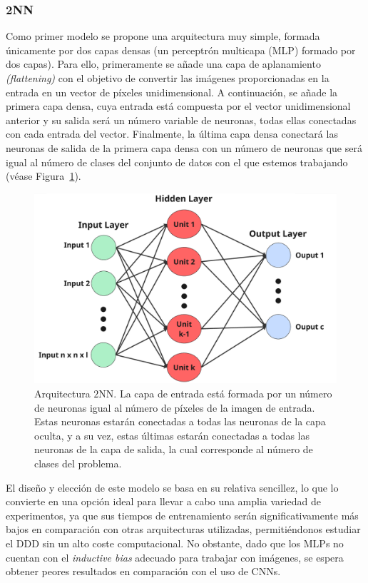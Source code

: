 \subsubsection{2NN}\label{subsubsec:2NN}

Como primer modelo se propone una arquitectura muy simple, formada únicamente por dos capas densas (un perceptrón multicapa (MLP) formado por dos capas). Para ello, primeramente se añade una capa de aplanamiento \textit{(flattening)} con el objetivo de convertir las imágenes proporcionadas en la entrada en un vector de píxeles unidimensional. A continuación, se añade la primera capa densa, cuya entrada está compuesta por el vector unidimensional anterior y su salida será un número variable de neuronas, todas ellas conectadas con cada entrada del vector. Finalmente, la última capa densa conectará las neuronas de salida de la primera capa densa con un número de neuronas que será igual al número de clases del conjunto de datos con el que estemos trabajando (véase Figura~\ref{fig:arquitecura2nn}).

\begin{figure}[h]
    \centering
    \includegraphics[width=0.6\linewidth]{img/arquitectura2nn.png}
    \caption[Arquitectura $2$NN.]{Arquitectura $2$NN. La capa de entrada está formada por un número de neuronas igual al número de píxeles de la imagen de entrada. Estas neuronas estarán conectadas a todas las neuronas de la capa oculta, y a su vez, estas últimas estarán conectadas a todas las neuronas de la capa de salida, la cual corresponde al número de clases del problema.}\label{fig:arquitecura2nn}
\end{figure}

El diseño y elección de este modelo se basa en su relativa sencillez, lo que lo convierte en una opción ideal para llevar a cabo una amplia variedad de experimentos, ya que sus tiempos de entrenamiento serán significativamente más bajos en comparación con otras arquitecturas utilizadas, permitiéndonos estudiar el DDD sin un alto coste computacional. No obstante, dado que los MLPs no cuentan con el \textit{inductive bias} adecuado para trabajar con imágenes, se espera obtener peores resultados en comparación con el uso de CNNs.

